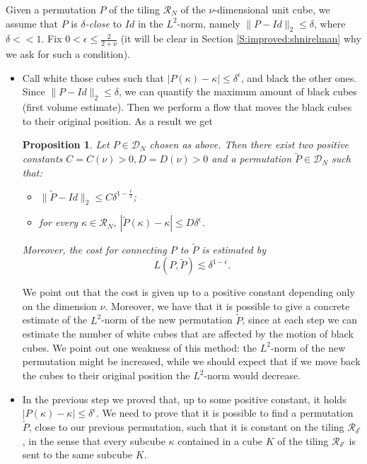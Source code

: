 \documentclass[12 pt]{article}
\theoremstyle{definition} \newtheorem{definition}{Definition}[section]
\theoremstyle{definition} \newtheorem{remark}[definition]{Remark}
\theoremstyle{plain} \newtheorem{lemma}[definition]{Lemma}
\theoremstyle{plain} \newtheorem{proposition}[definition]{Proposition}
\theoremstyle{plain} \newtheorem{theorem}[definition]{Theorem}
\theoremstyle{plain} \newtheorem{corollary}[definition]{Corollary}
\theoremstyle{definition} \newtheorem{example}[definition]{Example}
\theoremstyle{definition} \newtheorem{assumption}[definition]{Assumption}
\theoremstyle{definition} \newtheorem{conjecture}[definition]{Conjecture}
\newcommand{\1}{\mathbbm 1}
\numberwithin{equation}{section}
\begin{document}
         \medskip 
         Given a permutation $P$ of the tiling $\mathcal{R}_N$ of the $\nu$-dimensional unit cube, we assume that $P$ is \emph{$\delta$-close} to $Id$ in the $L^2$-norm, namely $\|P-Id\|_2\leq \delta$, where $\delta<<1$. Fix $0<\epsilon\leq\frac{2}{2+\nu}$ (it will be clear in Section \ref{S:improved:shnirelman} why we ask for such a condition). 
         \begin{itemize}
             \item[\textbf{Step 1)}] Call white those cubes such that $|P(\kappa)-\kappa|\leq\delta^\epsilon$, and black the other ones. Since $\|P-Id\|_2\leq\delta$, we can quantify the maximum amount of black cubes (first volume estimate). Then we  perform a flow that moves the black cubes to their original position. As a result we get


             
             
             \begin{proposition}\label{prop:Step1}
    Let $P\in\mathcal{D}_N$ chosen as above. Then there exist two positive constants $C=C(\nu)>0, D=D(\nu)>0$ and a permutation $\tilde P\in\mathcal{D}_N$ such that:
    \begin{itemize}
        \item $\|\tilde P-Id\|_2\leq C\delta^{1-\frac{\epsilon}{2}}$;
        \item for every $\kappa\in \mathcal{R}_N$, $|\tilde P(\kappa)-\kappa|\leq D{\delta}^{\epsilon}$.
    \end{itemize} 
    Moreover, the cost for connecting $P$ to $\tilde P$ is estimated by
    \begin{equation}\label{eq:cost:step:1}
        L(P,\tilde P)\lesssim \delta^{1-\epsilon}.
    \end{equation}
\end{proposition}
 We point out that the cost is given up to a positive constant depending only on the dimension $\nu$.  Moreover, we have that it is possible to give a concrete estimate of the $L^2$-norm of the new permutation $\tilde P$, since at each step we can estimate the number of white cubes that are affected by the motion of black cubes. We point out one weakness of this method: the $L^2$-norm of the new permutation might be increased, while we should expect that if we move back the cubes to their original position the $L^2$-norm would decrease. 

             
             \item[\textbf{Step 2)}]In the previous step we proved that, up to some positive constant, it holds $|P(\kappa)-\kappa|\leq\delta^\epsilon$. We need to prove that it is possible to find a permutation $\tilde P$, close to our previous permutation, such that it is constant on the tiling $\mathcal{R}_{\delta^\epsilon}$, in the sense that every subcube $\kappa$ contained in a cube $K$ of the tiling $\mathcal{R}_{\delta^\epsilon}$ is sent to the same subcube $K$. \medskip 
             

\end{itemize}
\end{document}
